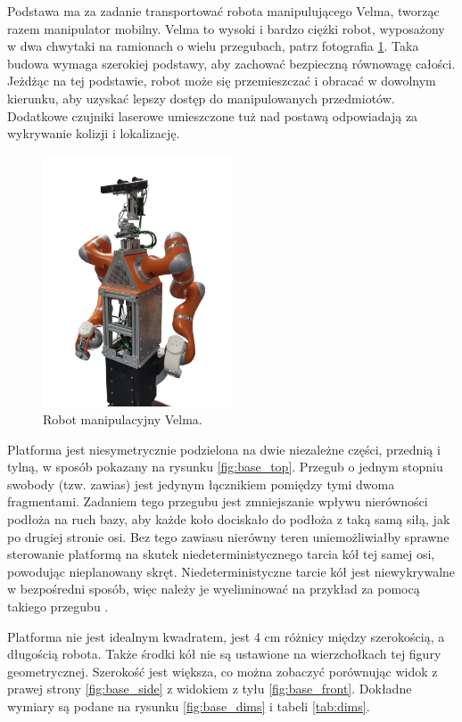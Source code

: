 	Podstawa ma za zadanie transportować robota manipulującego Velma, tworząc razem manipulator mobilny.
	Velma to wysoki i bardzo ciężki robot, wyposażony w dwa chwytaki na ramionach o wielu przegubach, patrz fotografia \ref{fig:velma}.
	Taka budowa wymaga szerokiej podstawy, aby zachować bezpieczną równowagę całości.
	Jeżdżąc na tej podstawie, robot może się przemieszczać i obracać w dowolnym kierunku, aby uzyskać lepszy dostęp do manipulowanych przedmiotów.
	Dodatkowe czujniki laserowe umieszczone tuż nad postawą odpowiadają za wykrywanie kolizji i lokalizację.

	\begin{figure}[H]
	\centering
	\includegraphics[width=0.5\textwidth]{graphics/velma.png}
	\caption{Robot manipulacyjny Velma.}
	\label{fig:velma}
	\end{figure} 

	Platforma jest niesymetrycznie podzielona na dwie niezależne części, przednią i tylną, w sposób pokazany na rysunku \ref{fig:base_top}.
	Przegub o jednym stopniu swobody (tzw. zawias) jest jedynym łącznikiem pomiędzy tymi dwoma fragmentami.
	Zadaniem tego przegubu jest zmniejszanie wpływu nierówności podłoża na ruch bazy, aby każde koło dociskało do podłoża z taką samą siłą, jak po drugiej stronie osi.
	Bez tego zawiasu nierówny teren uniemożliwiałby sprawne sterowanie platformą na skutek niedeterministycznego tarcia kół tej samej osi, powodując nieplanowany skręt.
	Niedeterministyczne tarcie kół jest niewykrywalne w bezpośredni sposób, więc należy je wyeliminować na przykład za pomocą takiego przegubu \cite{boringbot}.

	Platforma nie jest idealnym kwadratem, jest 4 cm różnicy między szerokością, a długością robota.
	Także środki kół nie są ustawione na wierzchołkach tej figury geometrycznej.
	Szerokość jest większa, co można zobaczyć porównując widok z prawej strony \ref{fig:base_side} z widokiem z tyłu \ref{fig:base_front}.
	Dokładne wymiary są podane na rysunku \ref{fig:base_dims} i tabeli \ref{tab:dims}.

